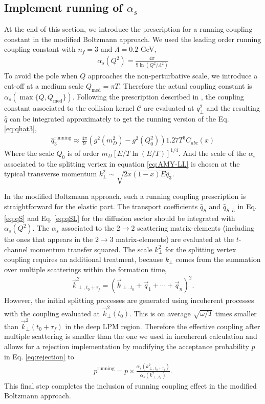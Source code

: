 \documentclass[aps, prc, reprint, amsmath, groupedaddress, nofootinbib]{revtex4-1}
\begin{document}
\subsection{Implement running of $\alpha_s$}\label{section:running}
At the end of this section, we introduce the prescription for a running coupling constant in the modified Boltzmann approach.
We used the leading order running coupling constant with $n_f = 3$ and $\Lambda = 0.2$ GeV, 
\begin{eqnarray}
\alpha_s(Q^2) = \frac{4\pi}{9\ln\left(Q^2/\Lambda^2\right)}
\end{eqnarray}
To avoid the pole when $Q$ approaches the non-perturbative scale, we introduce a cut-off at a medium scale $Q_{\textrm{med}} = \pi T$. 
Therefore the actual coupling constant is $\alpha_s(\max\{Q, Q_{\textrm{med}}\})$.
Following the prescription described in \cite{Arnold:2008zu}, the coupling constant associated to the collision kernel $\mathcal{C}$ are evaluated at $q_\perp^2$ and the resulting $\hat{q}$ can be integrated approximately to get the running version of the Eq. \ref{eq:qhat3},
\begin{eqnarray}
\hat{q}_3^{\textrm{running}} \approx \frac{4\pi}{9}\left(g^2(m_D^2) - g^2(Q_0^2)\right) 1.27 T^3 C_{abc}(x)
\label{eq:q3running}
\end{eqnarray}
Where the scale $Q_0$ is of order $m_D [E/T \ln(E/T)]^{1/4}$.
And the scale of the $\alpha_s$ associated to the splitting  vertex in equation \ref{eq:AMY-LL} is chosen at the typical transverse momentum $k_\perp^2 \sim \sqrt{2x(1-x)E\hat{q}_3}$.

In the modified Boltzmann approach, such a running coupling prescription is straightforward for the elastic part.
The transport coefficients $\hat{q}_S$ and $\hat{q}_{S, L}$ in Eq. \ref{eq:qS} and Eq. \ref{eq:qSL} for the diffusion sector should be integrated with $\alpha_s(Q^2)$.
The $\alpha_s$ associated to the $2\rightarrow 2$ scattering matrix-elements (including the ones that appears in the $2\rightarrow 3$ matrix-elements) are evaluated at the $t$-channel momentum transfer squared.
The scale $k_\perp^2$ for the splitting vertex coupling requires an additional treatment, because $k_\perp$ comes from the summation over multiple scatterings within the formation time,
\begin{eqnarray}\label{eq:kTn}
\vec{k}_{\perp, t_0+\tau_f}^2 = \left(\vec{k}_{\perp,t_0}+\vec{q}_1+\cdots+\vec{q}_n\right)^2.
\end{eqnarray} 
However, the initial splitting processes are generated using incoherent processes with the coupling evaluated at $\vec{k}_{\perp}^2(t_0)$.
This is on average $\sqrt{\omega/T}$ times smaller than $\vec{k}_{\perp}^2(t_0+\tau_f)$ in the deep LPM region.
Therefore the effective coupling after multiple scattering is smaller than the one we used in incoherent calculation and allows for a rejection implementation by modifying the acceptance probability $p$ in Eq. \ref{eq:rejection} to
\begin{eqnarray}
p^{\textrm{running}} = p\times \frac{\alpha_s(k_{\perp,t_0+\tau_f}^2)}{\alpha_s(k_{\perp,t_0}^2)}.
\end{eqnarray}
This final step completes the inclusion of running coupling effect in the modified Boltzmann approach.
\end{document}
